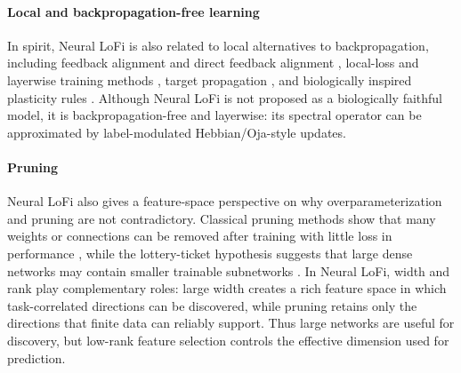 \paragraph{Local and backpropagation-free learning } In spirit,
Neural LoFi is also related to local alternatives to backpropagation, including feedback alignment and direct feedback alignment
\cite{lillicrap2016random,n2016direct,launay2020direct}, local-loss and layerwise training methods
\cite{n2019training,belilovsky2020decoupled}, target propagation
\cite{lee2015difference}, and biologically inspired plasticity rules
\cite{illing2019biologically,illing2021local}. Although Neural LoFi is not proposed as a biologically faithful model, it is backpropagation-free and layerwise: its spectral operator can be approximated by label-modulated Hebbian/Oja-style updates\cite{oja1982simplified,sanger1989optimal,gerstner2018eligibility,illing2021local}.


\paragraph{Pruning}  Neural LoFi also gives a feature-space perspective on why overparameterization and pruning are not contradictory. Classical pruning methods show that many weights or connections can be removed after training with little loss in performance
\cite{lecun1989optimal,han2015learning}, while the lottery-ticket hypothesis suggests that large dense networks may contain smaller trainable subnetworks
\cite{frankle2020linear}. In Neural LoFi, width and rank play complementary roles: large width creates a rich feature space in which task-correlated directions can be discovered, while  pruning retains only the directions that finite data can reliably support. Thus large networks are useful for discovery, but low-rank feature selection controls the effective dimension used for prediction.
